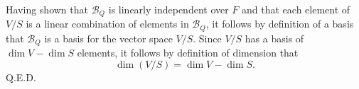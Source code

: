 \documentclass{article}
\begin{document}
Having shown that $\mathcal{B}_Q$ is linearly independent over $F$ and that each element of $V/S$ is a linear combination of elements in $\mathcal{B}_Q$, it follows by definition of a basis that $\mathcal{B}_Q$ is a basis for the vector space $V/S$. Since $V/S$ has a basis of $\dim V - \dim S$ elements, it follows by definition of dimension that 
$$ \dim (V/S) = \dim V - \dim S.$$ Q.E.D.
\end{document}
